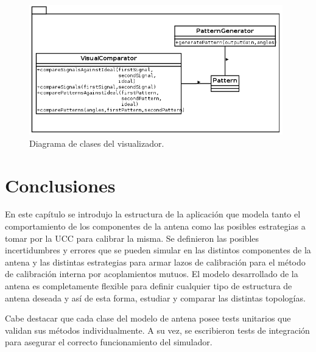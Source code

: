 \begin{figure}[H]
 \centering
 \includegraphics[width=11cm]{gfx/visualPackage.png}
 \caption{Diagrama de clases del visualizador.}
 \label{fig:visualPackage}
\end{figure}


\section{Conclusiones}

En este capítulo se introdujo la estructura de la aplicación que modela tanto el comportamiento de los componentes de la antena
como las posibles estrategias a tomar por la UCC para calibrar la misma. Se definieron las posibles incertidumbres y errores que
se pueden simular en las distintos componentes de la antena y las distintas estrategias para armar lazos de calibración para el 
método de calibración interna por acoplamientos mutuos. El modelo desarrollado de la antena es completamente flexible para
definir cualquier tipo de estructura de antena deseada y así de esta forma, estudiar y comparar las distintas topologías. 

Cabe destacar que cada clase del modelo de antena posee tests unitarios que validan sus métodos individualmente. A su vez, se
escribieron tests de integración para asegurar el correcto funcionamiento del simulador.

